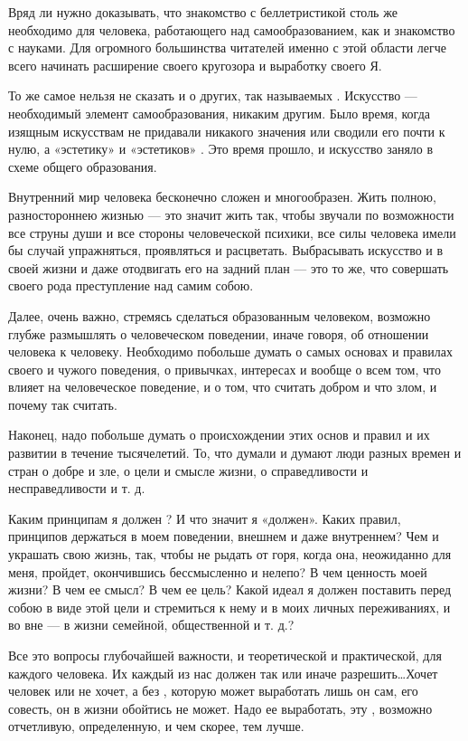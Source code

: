 Вряд ли нужно доказывать, что знакомство с беллетристикой столь же необходимо для человека, работающего над самообразованием, как и знакомство с науками. Для огромного большинства читателей именно с этой области легче всего начинать расширение своего кругозора и выработку своего Я.

То же самое нельзя не сказать и о других, так называемых . Искусство --- необходимый элемент самообразования,  никаким другим. Было время, когда изящным искусствам не придавали никакого значения или сводили его почти к нулю, а «эстетику» и «эстетиков» . Это время прошло, и искусство заняло  в схеме общего образования.

Внутренний мир человека бесконечно сложен и многообразен. Жить полною, разностороннею жизнью --- это значит жить так, чтобы звучали по возможности все струны души и все стороны человеческой психики, все силы человека имели бы случай упражняться, проявляться и расцветать. Выбрасывать искусство и в своей жизни и даже отодвигать его на задний план --- это то же, что совершать своего рода преступление над самим собою.

Далее, очень важно, стремясь сделаться образованным человеком, возможно глубже размышлять о человеческом поведении, иначе говоря, об отношении человека к человеку. Необходимо побольше думать о самых основах и правилах своего и чужого поведения, о привычках, интересах и вообще о всем том, что влияет на человеческое поведение, и о том, что считать добром и что злом, и почему так считать.

Наконец, надо побольше думать о происхождении этих основ и правил и их развитии в течение тысячелетий. То, что думали и думают люди разных времен и стран о добре и зле, о цели и смысле жизни, о справедливости и несправедливости и т. д.

Каким принципам я должен ? И что значит я «должен». Каких правил, принципов держаться в моем поведении, внешнем и даже внутреннем? Чем  и украшать свою жизнь, так, чтобы не рыдать от горя, когда она, неожиданно для меня, пройдет, окончившись бессмысленно и нелепо? В чем ценность моей жизни? В чем ее смысл? В чем ее цель? Какой идеал я должен поставить перед собою в виде этой цели и стремиться к нему и в моих личных переживаниях, и во вне --- в жизни семейной, общественной и т. д.?

Все это вопросы глубочайшей важности, и теоретической и практической, для каждого человека. Их каждый из нас должен так или иначе разрешить\dots Хочет человек или не хочет, а без , которую может выработать лишь он сам, его совесть, он в жизни обойтись не может. Надо ее выработать, эту , возможно отчетливую, определенную, и чем скорее, тем лучше.

